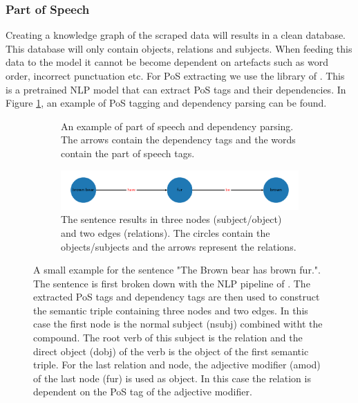 \documentclass[a4paper, 12pt, oneside]{book} %
\begin{document}
\subsubsection{Part of Speech}
Creating a knowledge graph of the scraped data will results in a clean database.
This database will only contain objects, relations and subjects. 
When feeding this data to the model it cannot be become dependent on artefacts such as word order, incorrect punctuation etc.
For PoS extracting we use the library of \autocite{honnibal_spacy_2020}.
This is a pretrained NLP model that can extract PoS tags and their dependencies.
In Figure \ref{fig:PoS_example}, an example of PoS tagging and dependency parsing can be found.
\begin{figure} [htb]
    \centering
    \begin{subfigure}[b]{1.0\textwidth}
        \centering
        
        \caption[Example of part of speech tagging]{An example of part of speech and dependency parsing. The arrows contain the dependency tags and the words contain the part of speech tags.}
        \label{fig:PoS_example}
    \end{subfigure}
    \vfill
    \begin{subfigure}[b]{1.0\textwidth}
        \centering
        \includegraphics[width=\textwidth]{kn_example.pdf}
        \caption[Example of a knowledge graph]{The sentence  results in three nodes (subject/object) and two edges (relations). The circles contain the objects/subjects and the arrows represent the relations.}
        \label{fig:graph_example}    
    \end{subfigure}
    \caption[Part of Speech tagging and knowledge graph]{A small example for the sentence "The Brown bear has brown fur.". The sentence is first broken down with the NLP pipeline of \textcite{honnibal_spacy_2020}. The extracted PoS tags and dependency tags are then used to construct the semantic triple containing three nodes and two edges. In this case the first node is the normal subject (nsubj) combined witht the compound. The root verb of this subject is the relation and the direct object (dobj) of the verb is the object of the first semantic triple. For the last relation and node, the adjective modifier (amod) of the last node (fur) is used as object. In this case the relation is dependent on the PoS tag of the adjective modifier.}
\end{figure}
\end{document}
